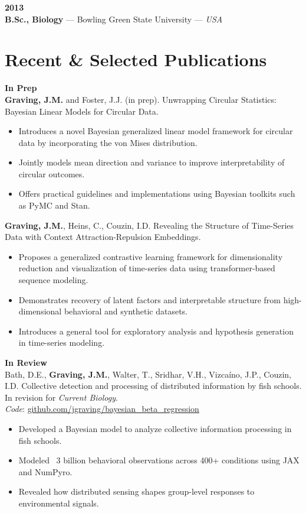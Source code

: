 \documentclass[10pt,letterpaper]{article}
\begin{document}
\textbf{2013} \\
\textbf{B.Sc., Biology} — Bowling Green State University — \textit{USA}





	
	\section*{Recent \& Selected Publications}
	\textbf{In Prep}\\
	\textbf{Graving, J.M.} and Foster, J.J. (in prep). Unwrapping Circular Statistics: Bayesian Linear Models for Circular Data.
	\begin{itemize}
		\item Introduces a novel Bayesian generalized linear model framework for circular data by incorporating the von Mises distribution.
		\item Jointly models mean direction and variance to improve interpretability of circular outcomes.
		\item Offers practical guidelines and implementations using Bayesian toolkits such as PyMC and Stan.
	\end{itemize}
	
	\textbf{Graving, J.M.}, Heins, C., Couzin, I.D. Revealing the Structure of Time-Series Data with Context Attraction-Repulsion Embeddings.
	\begin{itemize}
		\item Proposes a generalized contrastive learning framework for dimensionality reduction and visualization of time-series data using transformer-based sequence modeling.
		\item Demonstrates recovery of latent factors and interpretable structure from high-dimensional behavioral and synthetic datasets.
		\item Introduces a general tool for exploratory analysis and hypothesis generation in time-series modeling.
	\end{itemize}

	
	\vspace{4pt}
	\textbf{In Review}\\
	Bath, D.E., \textbf{Graving, J.M.}, Walter, T., Sridhar, V.H., Vizcaíno, J.P., Couzin, I.D. Collective detection and processing of distributed information by fish schools. In revision for \textit{Current Biology}. \\ \textit{Code}: \href{https://github.com/jgraving/bayesian_beta_regression}{github.com/jgraving/bayesian\_beta\_regression}
	\begin{itemize}
		\item Developed a Bayesian model to analyze collective information processing in fish schools.
		\item Modeled ~3 billion behavioral observations across 400+ conditions using JAX and NumPyro.
		\item Revealed how distributed sensing shapes group-level responses to environmental signals.
	\end{itemize}
	
\end{document}
